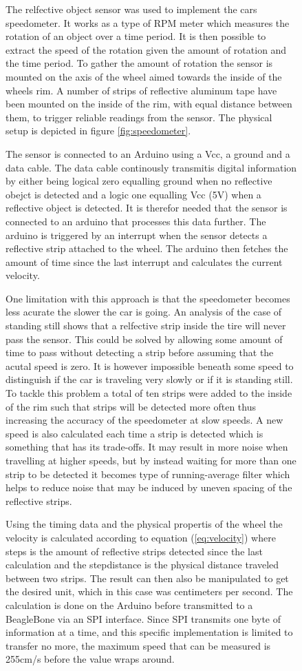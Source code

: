 \documentclass[11pt, titlepage]{article} %
\begin{document}
\begin{figure}
The relfective object sensor was used to implement the cars speedometer. It works as a type of RPM meter which measures the rotation of an object over a time period. It is then possible to extract the speed of the rotation given the amount of rotation and the time period. To gather the amount of rotation the sensor is mounted on the axis of the wheel aimed towards the inside of the wheels rim. A number of strips of reflective aluminum tape have been mounted on the inside of the rim, with equal distance between them, to trigger reliable readings from the sensor. The physical setup is depicted in figure \ref{fig:speedometer}.

The sensor is connected to an Arduino using a Vcc, a ground and a data cable. The data cable continously transmitis digital information by either being logical zero equalling ground when no reflective obejct is detected and a logic one equalling Vcc (5V) when a reflective object is detected. It is therefor needed that the sensor is connected to an arduino that processes this data further. The arduino is triggered by an interrupt when the sensor detects a reflective strip attached to the wheel. The arduino then fetches the amount of time since the last interrupt and calculates the current velocity.

One limitation with this approach is that the speedometer becomes less acurate the slower the car is going. An analysis of the case of standing still shows that a relfective strip inside the tire will never pass the sensor. This could be solved by allowing some amount of time to pass without detecting a strip before assuming that the acutal speed is zero. It is however impossible beneath some speed to distinguish if the car is traveling very slowly or if it is standing still. To tackle this problem a total of ten strips were added to the inside of the rim such that strips will be detected more often thus increasing the accuracy of the speedometer at slow speeds. A new speed is also calculated each time a strip is detected which is something that has its trade-offs. It may result in more noise when travelling at higher speeds, but by instead waiting for more than one strip to be detected it becomes type of running-average filter which helps to reduce noise that may be induced by uneven spacing of the reflective strips.

    Using the timing data and the physical propertis of the wheel the velocity is calculated according to equation (\ref{eq:velocity}) where steps is the amount of reflective strips detected since the last calculation and the stepdistance is the physical distance traveled between two strips. The result can then also be manipulated to get the desired unit, which in this case was centimeters per second. The calculation is done on the Arduino before transmitted to a BeagleBone via an SPI interface. Since SPI transmits one byte of information at a time, and this specific implementation is limited to transfer no more, the maximum speed that can be measured is 255cm/s before the value wraps around.


\end{figure}
\end{document}
